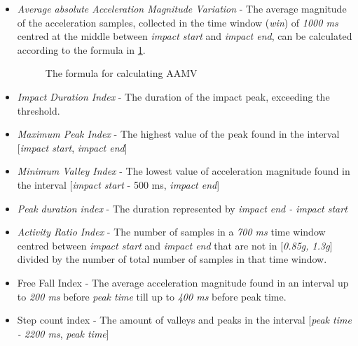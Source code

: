 \documentclass[12pt, a4paper, onecolumn]{article}
\begin{document}
	\begin{itemize}
		\item \textit{Average absolute Acceleration Magnitude Variation} - The average magnitude of the acceleration samples, collected in the time window (\textit{win}) of \textit{1000 ms} centred at the middle between \textit{impact start} and \textit{impact end}, can be calculated according to the formula in \ref{fig:aamv-formula}. 
		
		
		\begin{figure}[H]
			\centering
			\caption{The formula for calculating AAMV \cite{piza_uni}}%
			\label{fig:aamv-formula}%
		\end{figure}
		
		\item \textit{Impact Duration Index} - The duration of the impact peak, exceeding the threshold.
		\item \textit{Maximum Peak Index} - The highest value of the peak found in the interval [\textit{impact start}, \textit{impact end}]
		
		\item \textit{Minimum Valley Index} - The lowest value of acceleration magnitude found in the interval [\textit{impact start} - 500 ms, \textit{impact end}]
		
		\item \textit{Peak duration index} - The duration represented by \textit{impact end - impact start}
		\item \textit{Activity Ratio Index} - The number of samples in a \textit{700 ms} time window centred between \textit{impact start} and \textit{impact end} that are not in [\textit{0.85g, 1.3g}] divided by the number of total number of samples in that time window.
		
		\item{Free Fall Index} - The average acceleration magnitude found in an interval up to \textit{200 ms} before \textit{peak time} till up to \textit{400 ms} before peak time.
		
		\item{Step count index} - The amount of valleys and peaks in the interval [\textit{peak time - 2200 ms}, \textit{peak time}]
	\end{itemize}
	
\end{document}
